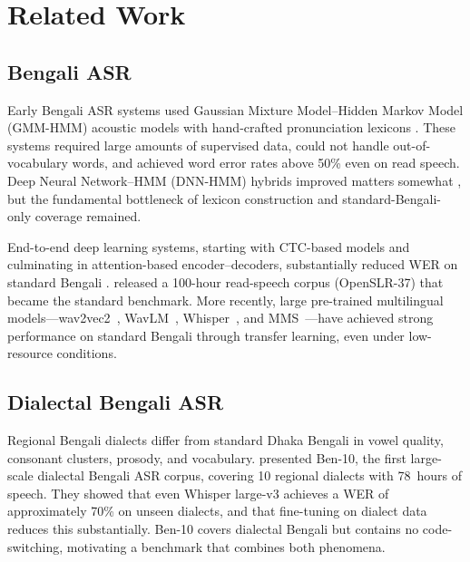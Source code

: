 \section{Related Work}
\label{sec:related}

\subsection{Bengali ASR}

Early Bengali ASR systems used Gaussian Mixture Model--Hidden Markov Model
(GMM-HMM) acoustic models with hand-crafted pronunciation lexicons
\citep{hasnat2007isolated}.
These systems required large amounts of supervised data, could not handle
out-of-vocabulary words, and achieved word error rates above 50\% even on
read speech.
Deep Neural Network--HMM (DNN-HMM) hybrids improved matters somewhat
\citep{ali2015automatic}, but the fundamental bottleneck of lexicon
construction and standard-Bengali-only coverage remained.

End-to-end deep learning systems, starting with CTC-based models
\citep{graves2006ctc} and culminating in attention-based encoder--decoders,
substantially reduced WER on standard Bengali
\citep{islam2019banglasr}.
\citet{kjartansson2018bengali} released a 100-hour read-speech corpus
(OpenSLR-37) that became the standard benchmark.
More recently, large pre-trained multilingual models---wav2vec2~\citep{babu2022xlsr},
WavLM~\citep{chen2022wavlm}, Whisper~\citep{radford2023whisper}, and
MMS~\citep{pratap2024mms}---have achieved strong performance on standard Bengali
through transfer learning, even under low-resource conditions.

\subsection{Dialectal Bengali ASR}

Regional Bengali dialects differ from standard Dhaka Bengali in vowel quality,
consonant clusters, prosody, and vocabulary.
\citet{ben10_2025} presented Ben-10, the first large-scale dialectal Bengali
ASR corpus, covering 10 regional dialects with 78~hours of speech.
They showed that even Whisper large-v3 achieves a WER of approximately 70\%
on unseen dialects, and that fine-tuning on dialect data reduces this
substantially.
Ben-10 covers dialectal Bengali but contains no code-switching, motivating a
benchmark that combines both phenomena.

